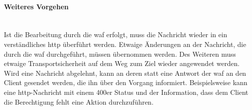 \paragraph{Weiteres Vorgehen}\ \\
Ist die Bearbeitung durch die \ac{waf} erfolgt, muss die Nachricht wieder in ein verständliches \ac{http} überführt werden.
Etwaige Änderungen an der Nachricht, die durch die \ac{waf} durchgeführt, müssen übernommen werden.
Des Weiteren muss etwaige Transportsicherheit auf dem Weg zum Ziel wieder angewendet werden.\\

Wird eine Nachricht abgelehnt, kann an deren statt eine Antwort der \ac{waf} an den Client gesendet werden, die ihn über den Vorgang informiert.
Beispielsweise kann eine \ac{http}-Nachricht mit einem 400er Status und der Information, dass dem Client die Berechtigung fehlt eine Aktion durchzuführen.




